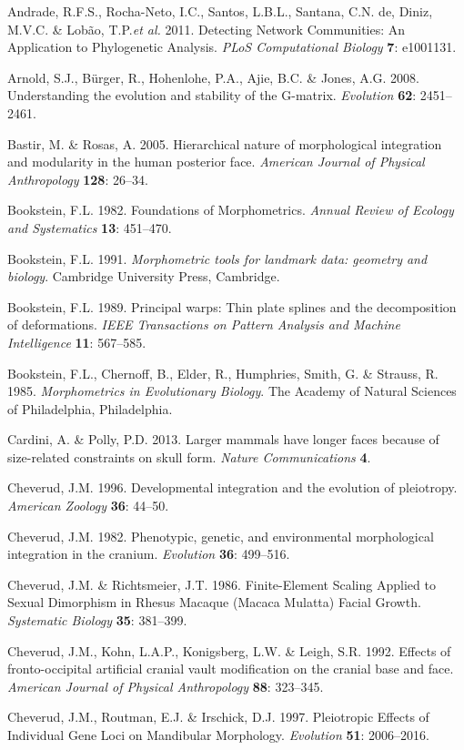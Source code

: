 \documentclass[12pt,]{article}
\begin{document}
Andrade, R.F.S., Rocha-Neto, I.C., Santos, L.B.L., Santana, C.N. de,
Diniz, M.V.C. \& Lobão, T.P.\emph{et al.} 2011. Detecting Network
Communities: An Application to Phylogenetic Analysis. \emph{PLoS
Computational Biology} \textbf{7}: e1001131.

Arnold, S.J., Bürger, R., Hohenlohe, P.A., Ajie, B.C. \& Jones, A.G.
2008. Understanding the evolution and stability of the G-matrix.
\emph{Evolution} \textbf{62}: 2451--2461.

Bastir, M. \& Rosas, A. 2005. Hierarchical nature of morphological
integration and modularity in the human posterior face. \emph{American
Journal of Physical Anthropology} \textbf{128}: 26--34.

Bookstein, F.L. 1982. Foundations of Morphometrics. \emph{Annual Review
of Ecology and Systematics} \textbf{13}: 451--470.

Bookstein, F.L. 1991. \emph{Morphometric tools for landmark data:
geometry and biology}. Cambridge University Press, Cambridge.

Bookstein, F.L. 1989. Principal warps: Thin plate splines and the
decomposition of deformations. \emph{IEEE Transactions on Pattern
Analysis and Machine Intelligence} \textbf{11}: 567--585.

Bookstein, F.L., Chernoff, B., Elder, R., Humphries, Smith, G. \&
Strauss, R. 1985. \emph{Morphometrics in Evolutionary Biology}. The
Academy of Natural Sciences of Philadelphia, Philadelphia.

Cardini, A. \& Polly, P.D. 2013. Larger mammals have longer faces
because of size-related constraints on skull form. \emph{Nature
Communications} \textbf{4}.

Cheverud, J.M. 1996. Developmental integration and the evolution of
pleiotropy. \emph{American Zoology} \textbf{36}: 44--50.

Cheverud, J.M. 1982. Phenotypic, genetic, and environmental
morphological integration in the cranium. \emph{Evolution} \textbf{36}:
499--516.

Cheverud, J.M. \& Richtsmeier, J.T. 1986. Finite-Element Scaling Applied
to Sexual Dimorphism in Rhesus Macaque (Macaca Mulatta) Facial Growth.
\emph{Systematic Biology} \textbf{35}: 381--399.

Cheverud, J.M., Kohn, L.A.P., Konigsberg, L.W. \& Leigh, S.R. 1992.
Effects of fronto-occipital artificial cranial vault modification on the
cranial base and face. \emph{American Journal of Physical Anthropology}
\textbf{88}: 323--345.

Cheverud, J.M., Routman, E.J. \& Irschick, D.J. 1997. Pleiotropic
Effects of Individual Gene Loci on Mandibular Morphology.
\emph{Evolution} \textbf{51}: 2006--2016.
\end{document}

